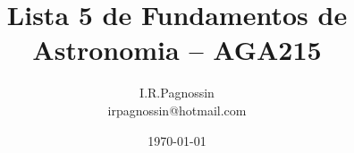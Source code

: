 \documentclass[a4paper,10pt]{article}
\begin{document}
\pagestyle{myheadings}
\renewcommand{\thefootnote}{\fnsymbol{footnote}}	

\title {Lista 5 de Fundamentos de Astronomia -- AGA215}  
\author {I.R.Pagnossin \\ irpagnossin@hotmail.com}
\date {\today}
\maketitle

 


\end{document}
